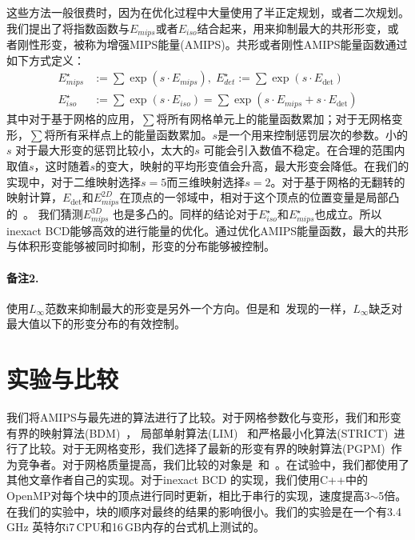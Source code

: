 这些方法一般很费时，因为在优化过程中大量使用了半正定规划，或者二次规划。我们提出了将指数函数与$E_{mips}$或者$E_{iso}$结合起来，用来抑制最大的共形形变，或者刚性形变，被称为增强MIPS能量(AMIPS)。共形或者刚性AMIPS能量函数通过如下方式定义：
\begin{align}
E^{\star}_{mips} &:= \sum \exp(s \cdot E_{mips}),\; E^{\star}_{det} := \sum \exp(s \cdot E_{\det}) \\
E^{\star}_{iso} &:= \sum \exp(s \cdot E_{iso}) = \sum \exp(s \cdot E_{mips}+s \cdot E_{\det})
\end{align}
其中对于基于网格的应用，$\sum$将所有网格单元上的能量函数累加；对于无网格变形，$\sum$将所有采样点上的能量函数累加。$s$是一个用来控制惩罚层次的参数。小的$s$ 对于最大形变的惩罚比较小，太大的$s$ 可能会引入数值不稳定。在合理的范围内取值$s$，这时随着$s$的变大，映射的平均形变值会升高，最大形变会降低。在我们的实现中，对于二维映射选择$s=5$而三维映射选择$s=2$。对于基于网格的无翻转的映射计算，$E_{\det}$和$E_{mips}^{2D}$在顶点的一邻域中，相对于这个顶点的位置变量是局部凸的~\cite{Hormann2001,Jiao2011}。 我们猜测$E_{mips}^{3D}$ 也是多凸的。同样的结论对于$E^{\star}_{iso}$和$E^{\star}_{mips}$也成立。所以inexact BCD能够高效的进行能量的优化。通过优化AMIPS能量函数，最大的共形与体积形变能够被同时抑制，形变的分布能够被控制。%

\paragraph{备注2.} 使用$L_\infty$范数来抑制最大的形变是另外一个方向。但是和~\cite{Levi2014}发现的一样，$L_\infty$缺乏对最大值以下的形变分布的有效控制。

\section{实验与比较} \label{sec:AMIPS_results}
我们将AMIPS与最先进的算法进行了比较。对于网格参数化与变形，我们和形变有界的映射算法(BDM)~\cite{Lipman2012,Aigerman2013}， 局部单射算法(LIM) ~\cite{Schuller2013}和严格最小化算法(STRICT)~\cite{Levi2014}进行了比较。对于无网格变形，我们选择了最新的形变有界的映射算法(PGPM)~\cite{Poranne2014}作为竞争者。对于网格质量提高，我们比较的对象是~\cite{Brewer2003}和~\cite{Fu2014}。在试验中，我们都使用了其他文章作者自己的实现。对于inexact BCD 的实现，我们使用C++中的OpenMP对每个块中的顶点进行同时更新，相比于串行的实现，速度提高3$\sim$5倍。在我们的实验中，块的顺序对最终的结果的影响很小。我们的实验是在一个有3.4\,GHz 英特尔i7\,CPU和16\,GB内存的台式机上测试的。

